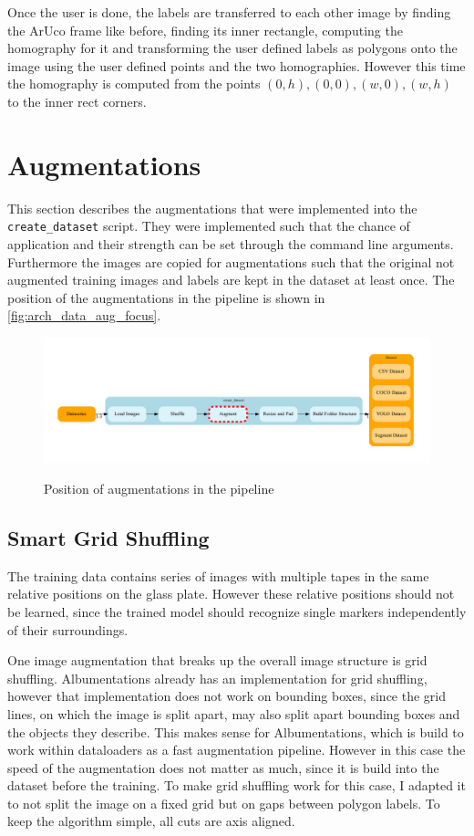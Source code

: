 \documentclass[10pt]{book}
\begin{document}
Once the user is done, the labels are transferred to each other image by finding the \ac{ArUco} frame like before, finding its inner rectangle, computing the homography for it and transforming the user defined labels as polygons onto the image using the user defined points and the two homographies. However this time the homography is computed from the points $(0,h), (0,0), (w,0), (w,h)$ to the inner rect corners.

\section{Augmentations}

This section describes the augmentations that were implemented into the \texttt{create\_dataset} script. They were implemented such that the chance of application and their strength can be set through the command line arguments. Furthermore the images are copied for augmentations such that the original not augmented training images and labels are kept in the dataset at least once. The position of the augmentations in the pipeline is shown in \autoref{fig:arch_data_aug_focus}.

\begin{figure}
  \caption{Position of augmentations in the pipeline}
  \includegraphics[width=\textwidth]{graph/arch_data_aug_focus}
  \label{fig:arch_data_aug_focus}
\end{figure}

\subsection{Smart Grid Shuffling}

The training data contains series of images with multiple tapes in the same relative positions on the glass plate. However these relative positions should not be learned, since the trained model should recognize single markers independently of their surroundings. 

One image augmentation that breaks up the overall image structure is grid shuffling. Albumentations already has an implementation for grid shuffling, however that implementation does not work on bounding boxes, since the grid lines, on which the image is split apart, may also split apart bounding boxes and the objects they describe. This makes sense for Albumentations, which is build to work within dataloaders as a fast augmentation pipeline. However in this case the speed of the augmentation does not matter as much, since it is build into the dataset before the training. To make grid shuffling work for this case, I adapted it to not split the image on a fixed grid but on gaps between polygon labels. To keep the algorithm simple, all cuts are axis aligned.
\end{document}
